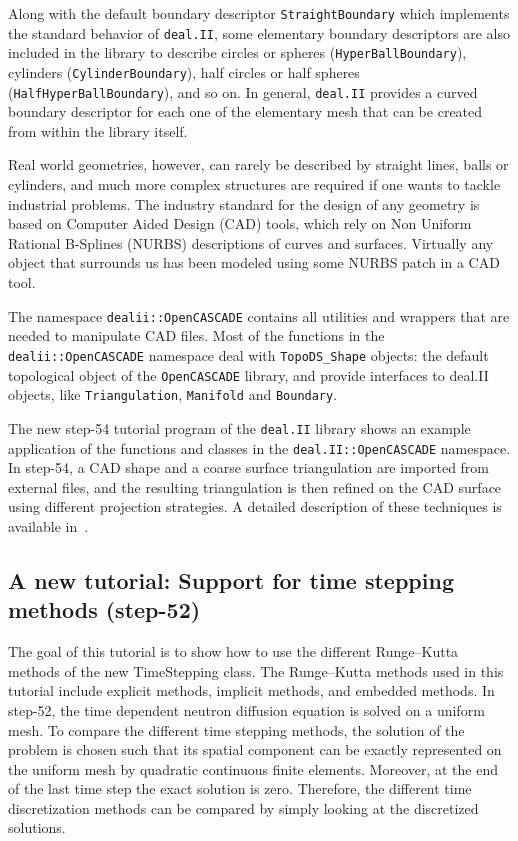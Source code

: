 \documentclass{ansarticle}
\newcommand{\specialword}[1]{\texttt{#1}}
\newcommand{\dealii}{{\specialword{deal.II}}}
\begin{document}
Along with the default boundary descriptor \verb|StraightBoundary|
which implements the standard behavior of \dealii{}, some elementary
boundary descriptors are also included in the library to describe
circles or spheres (\verb|HyperBallBoundary|), cylinders
(\verb|CylinderBoundary|), half circles or half spheres
(\verb|HalfHyperBallBoundary|), and so on. In general, \dealii{}
provides a curved boundary descriptor for each one of the elementary
mesh that can be created from within the library itself.

Real world geometries, however, can rarely be described by straight
lines, balls or cylinders, and much more complex structures are
required if one wants to tackle industrial problems. The industry
standard for the design of any geometry is based on Computer Aided
Design (CAD) tools, which rely on Non Uniform Rational B-Splines
(NURBS) descriptions of curves and surfaces. Virtually any object that
surrounds us has been modeled using some NURBS patch in a CAD tool.

The namespace \verb|dealii::OpenCASCADE| contains all utilities and
wrappers that are needed to manipulate CAD files. Most of the
functions in the \verb|dealii::OpenCASCADE| namespace deal with
\verb|TopoDS_Shape| objects: the default topological object of the
\verb|OpenCASCADE| library, and provide interfaces to deal.II objects,
like \verb|Triangulation|, \verb|Manifold| and \verb|Boundary|.

The new step-54 tutorial program of the \dealii{} library shows an example
application of the functions and classes in the
\verb|deal.II::OpenCASCADE| namespace. In step-54, a CAD shape and a
coarse surface triangulation are imported from external files, and the
resulting triangulation is then refined on the CAD surface using
different projection strategies. A detailed description of these
techniques is available in~\cite{HeltaiMola2015}.

\subsection{A new tutorial: Support for time stepping methods (step-52)}
The goal of this tutorial is to show how to use the different Runge--Kutta
methods of the new TimeStepping class. The Runge--Kutta methods used in this
tutorial include explicit methods, implicit methods, and embedded methods. In
step-52, the time dependent neutron diffusion equation is solved on a uniform
mesh. To compare the different time stepping methods, the solution of the
problem is chosen such that its spatial component can be exactly represented on
the uniform mesh by quadratic continuous finite elements. Moreover, at the
end of the last time step the exact solution is zero. Therefore, the different
time discretization methods can be compared by simply looking at the discretized
solutions.
\end{document}
